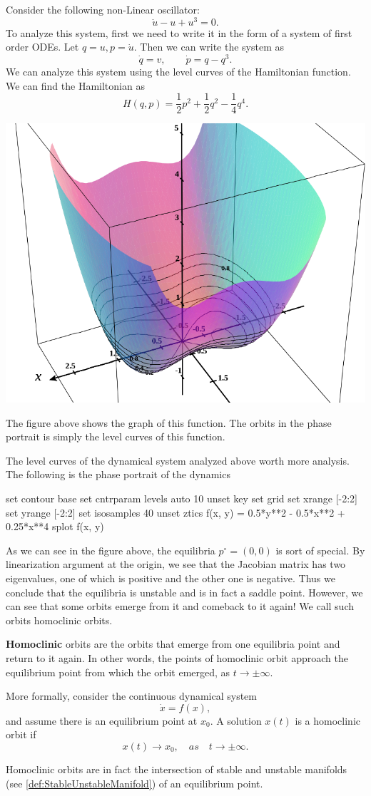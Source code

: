 \begin{example}
	Consider the following non-Linear oscillator:
	\[ \ddot{u} - u + u^3 = 0. \]
	To analyze this system, first we need to write it in the form of a system of first order ODEs. Let $q = u, p = \dot{u}$. Then we can write the system as
	\[ \dot{q} = v, \qquad \dot{p}=q - q^3. \]
	We can analyze this system using the level curves of the Hamiltonian function. We can find the Hamiltonian as
	\[ H(q,p) = \frac{1}{2} p^2 + \frac{1}{2} q^2 - \frac{1}{4} q^4 . \]

	\begin{center}
		\includegraphics[width=0.4\linewidth]{HamiltonianExample1}
	\end{center}
	
	The figure above shows the graph of this function. The orbits in the phase portrait is simply the level curves of this function. 
\end{example}

The level curves of the dynamical system analyzed above worth more analysis. The following is the phase portrait of the dynamics


\begin{gnuplot}[terminal=epslatex, terminaloptions=color]
	set contour base
	set cntrparam levels auto 10
	unset key
	set grid
	set xrange [-2:2]
	set yrange [-2:2]
	set isosamples 40
	unset ztics
	f(x, y) = 0.5*y**2 - 0.5*x**2 + 0.25*x**4
	splot f(x, y)
\end{gnuplot}

As we can see in the figure above, the equilibria $p^\circ = (0,0)$ is sort of special. By linearization argument at the origin, we see that the Jacobian matrix has two eigenvalues, one of which is positive and the other one is negative. Thus we conclude that the equilibria is unstable and is in fact a saddle point. However, we can see that some orbits emerge from it and comeback to it again! We call such orbits homoclinic orbits. 

\begin{defbox}
	\textbf{Homoclinic} orbits are the orbits that emerge from one equilibria point and return to it again. In other words, the points of homoclinic orbit approach the equilibrium point from which the orbit emerged, as $t\to\pm\infty$.
	
	More formally, consider the continuous dynamical system 
	\[ \dot{x} = f(x), \]
	and assume there is an equilibrium point at $x_0$. A solution $x(t)$ is a homoclinic orbit if
	\[ x(t) \to x_0,\quad as \quad t\to\pm\infty. \]
\end{defbox}

Homoclinic orbits are in fact the intersection of stable and unstable manifolds (see \autoref{def:StableUnstableManifold}) of an equilibrium point. 